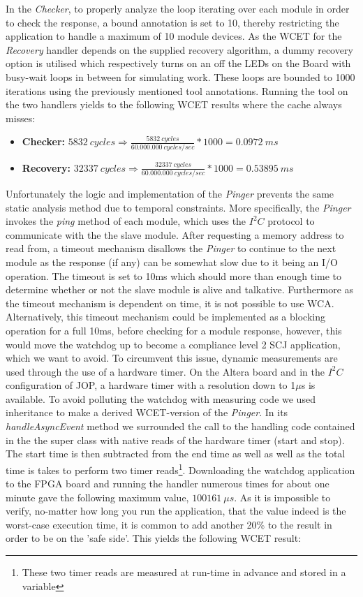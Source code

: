 In the \textit{Checker}, to properly analyze the loop iterating over each module in order to check the response, a bound annotation is set to 10, thereby restricting the application to handle a maximum of 10 module devices. As the WCET for the \textit{Recovery} handler depends on the supplied recovery algorithm, a dummy recovery option is utilised which respectively turns on an off the LEDs on the Board with busy-wait loops in between for simulating work. These loops are bounded to 1000 iterations using the previously mentioned tool annotations. Running the tool on the two handlers yields to the following WCET results where the cache always misses:
\begin{itemize}
    \item \textbf{Checker:} $5832\ cycles \Rightarrow \frac{5832\ cycles}{60.000.000\ cycles/sec} * 1000 = 0.0972\ ms$
    \item \textbf{Recovery:} $32337\ cycles \Rightarrow \frac{32337\ cycles}{60.000.000\ cycles/sec} * 1000 = 0.53895\ ms$
\end{itemize}

Unfortunately the logic and implementation of the \textit{Pinger} prevents the same static analysis method due to temporal constraints. More specifically, the \textit{Pinger} invokes the \textit{ping} method of each module, which uses the $\textit{I}^2\textit{C}$ protocol to communicate with the the slave module. After requesting a memory address to read from, a timeout mechanism disallows the \textit{Pinger} to continue to the next module as the response (if any) can be somewhat slow due to it being an I/O operation. The timeout is set to 10ms which should more than enough time to determine whether or not the slave module is alive and talkative. Furthermore as the timeout mechanism is dependent on time, it is not possible to use WCA. Alternatively, this timeout mechanism could be implemented as a blocking operation for a full 10ms, before checking for a module response, however, this would move the watchdog up to become a compliance level 2 SCJ application, which we want to avoid. To circumvent this issue, dynamic measurements are used through the use of a hardware timer. On the Altera board and in the $\textit{I}^2\textit{C}$ configuration of JOP, a hardware timer with a resolution down to 1$\mu$s is available. To avoid polluting the watchdog with measuring code we used inheritance to make a derived WCET-version of the \textit{Pinger}. In its \textit{handleAsyncEvent} method we surrounded the call to the handling code contained in the the super class with native reads of the hardware timer (start and stop). The start time is then subtracted from the end time as well as well as the total time is takes to perform two timer reads\footnote{These two timer reads are measured at run-time in advance and stored in a variable}. Downloading the watchdog application to the FPGA board and running the handler numerous times for about one minute gave the following maximum value, $100161\ \mu s $. As it is impossible to verify, no-matter how long you run the application, that the value indeed is the worst-case execution time, it is common to add another 20\% to the result in order to be on the 'safe side'. This yields the following WCET result:

